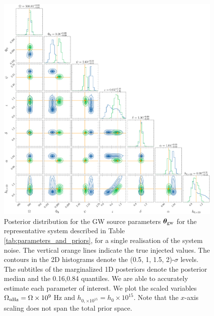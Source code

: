 \documentclass[fleqn,usenatbib,useAMS]{mnras}
\begin{document}
	\begin{figure}
	\includegraphics[width=\textwidth, height =\textwidth ]{images/corner_highSNR_compare}
	\caption{Posterior distribution for the GW source parameters $\boldsymbol{\theta}_{\rm gw}$ for the representative system described in Table \ref{tab:parameters_and_priors}, for a single realisation of the system noise. The vertical orange lines indicate the true injected values. The contours in the 2D histograms denote the (0.5, 1, 1.5, 2)-$\sigma$ levels. The subtitles of the marginalized 1D posteriors denote the posterior median and the 0.16,0.84 quantiles. We are able to accurately estimate each parameter of interest. We plot the scaled variables $\Omega_{\rm nHz} = \Omega \times 10^{9}$ Hz and $h_{0, \times 10^{15}} = h_0 \times 10^{15}$. Note that the $x$-axis scaling does not span the total prior space.}
	\label{fig:corner_plot_compare_high}
\end{figure}
\end{document}
